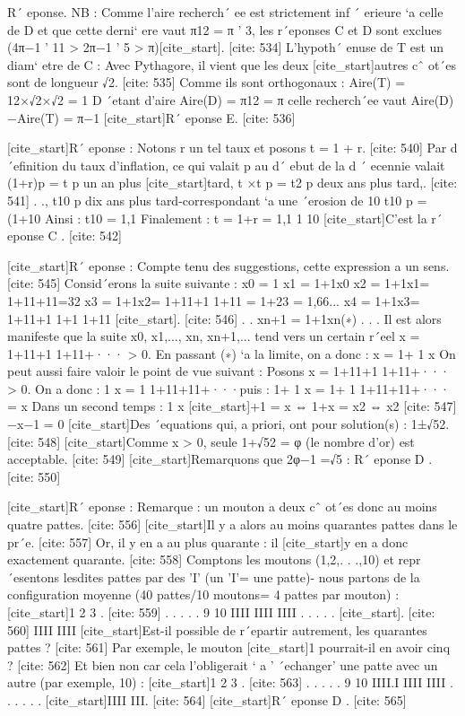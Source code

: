 R´ eponse. NB : Comme l’aire recherch´ ee est strictement inf ´ erieure `a celle 
 de D et que cette derni` ere vaut π12 = π ' 3, les r´eponses C et D sont exclues 
 (4π−1 ' 11 > 2π−1 ' 5 > π)[cite_start]. [cite: 534]
L’hypoth´ enuse de T est un diam` etre de C : Avec Pythagore, il vient que les deux
 [cite_start]autres cˆ ot´es sont de longueur √2. [cite: 535]
Comme ils sont orthogonaux :
 Aire(T) = 12×√2×√2 = 1
 D ´etant d’aire 
 Aire(D) = π12 = π
 celle recherch´ee vaut 
 Aire(D)−Aire(T) = π−1
 [cite_start]R´ eponse E. [cite: 536]

[cite_start]R´ eponse : Notons r un tel taux et posons t = 1 + r. [cite: 540]
Par d´efinition du taux 
 d’inflation, ce qui valait p au d´ ebut de la d ´ ecennie valait (1+r)p = t p un an plus
 [cite_start]tard, t ×t p = t2 p deux ans plus tard,. [cite: 541]
. ., t10 p dix ans plus tard-correspondant `a
 une 
 ´erosion de 10 %
 t10 p = (1+10%
 Ainsi :
 t10 = 1,1
 Finalement :
 t = 1+r = 1,1
 1
 10
 [cite_start]C’est la r´ eponse C . [cite: 542]

[cite_start]R´ eponse : Compte tenu des suggestions, cette expression a un sens. [cite: 545]
Consid´erons 
 la suite suivante :
 x0 = 1
 x1 = 1+1x0
 x2 = 1+1x1= 1+11+11=32
 x3 = 1+1x2= 1+11+1
 1+11
 = 1+23 = 1,66...
 x4 = 1+1x3= 1+11+1
 1+1
 1+11
 [cite_start]. [cite: 546]
.
 .
 xn+1 = 1+1xn(∗)
 .
 .
 .
 Il est alors manifeste que la suite x0, x1,..., xn, xn+1,... tend vers un certain r´eel 
 x = 1+11+1
 1+11+···
 > 0. En passant (∗) `a la limite, on a donc : 
 x = 1+
 1
 x
 On peut aussi faire valoir le point de vue suivant :
 Posons x = 1+11+1
 1+11+···
 > 0. On a donc :
 1
 x
 =
 1
 1+11+11+···puis :
 1+
 1
 x
 = 1+
 1
 1+11+11+···
 = x
 Dans un second temps :
 1
 x
 [cite_start]+1 = x ⇔ 1+x = x2 ⇔ x2 [cite: 547]
−x−1 = 0
 [cite_start]Des ´equations qui, a priori, ont pour solution(s) : 1±√52. [cite: 548]
[cite_start]Comme x > 0, seule 1+√52 = φ (le nombre d’or) est acceptable. [cite: 549]
[cite_start]Remarquons que 2φ−1 =√5 : R´ eponse D . [cite: 550]

[cite_start]R´ eponse : Remarque : un mouton a deux cˆ ot´es donc au moins quatre pattes. [cite: 556]
[cite_start]Il y a alors au moins quarantes pattes dans le pr´e. [cite: 557]
Or, il y en a au plus quarante : il 
 [cite_start]y en a donc exactement quarante. [cite: 558]
Comptons les moutons (1,2,. . .,10) et repr´esentons lesdites pattes par des ’I’ (un 
 ’I’= une patte)- nous partons de la configuration moyenne (40 pattes/10 moutons=
 4 pattes par mouton) :
 [cite_start]1 2 3 . [cite: 559]
. . . . . 9 10
 IIII IIII IIII . . . . . [cite_start]. [cite: 560]
IIII IIII
 [cite_start]Est-il possible de r´epartir autrement, les quarantes pattes ? [cite: 561]
Par exemple, le mouton 
 [cite_start]1 pourrait-il en avoir cinq ? [cite: 562]
Et bien non car cela l’obligerait ` a ’ ´echanger’ une patte 
 avec un autre (par exemple, 10) :
 [cite_start]1 2 3 . [cite: 563]
. . . . . 9 10
 IIII.I IIII IIII . . . . . . [cite_start]IIII III. [cite: 564]
[cite_start]R´ eponse D . [cite: 565]

